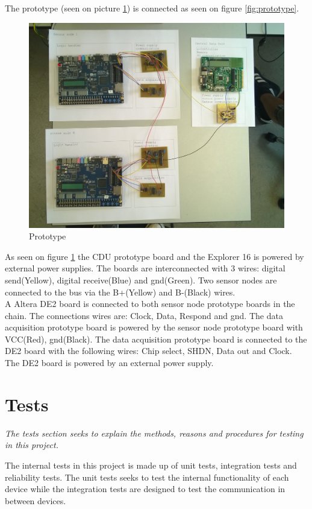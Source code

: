 The prototype (seen on picture \ref{pic:prototype}) is connected as seen on figure \ref{fig:prototype}.
\begin{figure}[H]
	\centering
	\includegraphics[width=1\textwidth]{billeder/11projectdescription/prototype}
	\caption{Prototype}
	\label{pic:prototype}
\end{figure}
As seen on figure \ref{pic:prototype} the CDU prototype board and the Explorer 16 is powered by external power supplies. The boards are interconnected with 3 wires: digital send(Yellow), digital receive(Blue) and gnd(Green). Two sensor nodes are connected to the bus via the B+(Yellow) and B-(Black) wires.\\
A Altera DE2 board is connected to both sensor node prototype boards in the chain. The connections wires are: Clock, Data, Respond and gnd. The data acquisition prototype board is powered by the  sensor node prototype board with VCC(Red), gnd(Black). The data acquisition prototype board is connected to the DE2 board with the following wires: Chip select, SHDN, Data out and Clock. The DE2 board is powered by an external power supply.



\section{Tests}
\textit{The tests section seeks to explain the methods, reasons and procedures for testing in this project.}

The internal tests in this project is made up of unit tests, integration tests and reliability tests. The unit tests seeks to test the internal functionality of each device while the integration tests are designed to test the communication in between devices.

